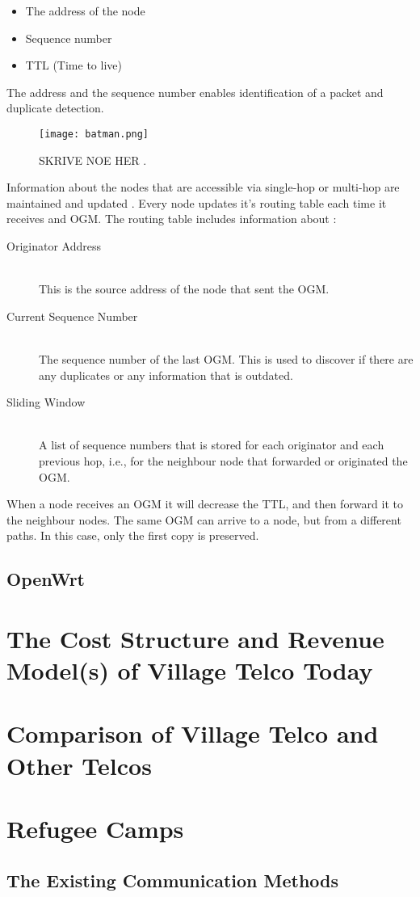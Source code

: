 \begin{itemize}
\item The address of the node
\item Sequence number
\item TTL (Time to live)
\end{itemize}

The address and the sequence number enables identification of a packet and duplicate detection. 

\begin{figure}[h!]
  \centering
    \texttt{[image: batman.png]}
     \caption{SKRIVE NOE HER \cite{batman2}.}
\label{fig:batman} 
\end{figure}


Information about the nodes that are accessible via single-hop or multi-hop are maintained and updated \cite{batman}. Every node updates it's routing table each time it receives and OGM. The routing table includes information about \cite{batman2}:

\begin{description}
  \item[Originator Address] \hfill \\
  This is the source address of the node that sent the OGM.
  \item[Current Sequence Number] \hfill \\
  The sequence number of the last OGM. This is used to discover if there are any duplicates or any information that is outdated.
  \item[Sliding Window] \hfill \\
  A list of sequence numbers that is stored for each originator and each previous hop, i.e., for the neighbour node that forwarded or originated the OGM. 
 
  
\end{description}

When a node receives an OGM it will decrease the TTL, and then forward it to the neighbour nodes. The same OGM can arrive to a node, but from a different paths. In this case, only the first copy is preserved. 


\subsection{OpenWrt}

\section{The Cost Structure and Revenue Model(s) of Village Telco Today}

\section{Comparison of Village Telco and Other Telcos}

\section{Refugee Camps}
\subsection{The Existing Communication Methods}